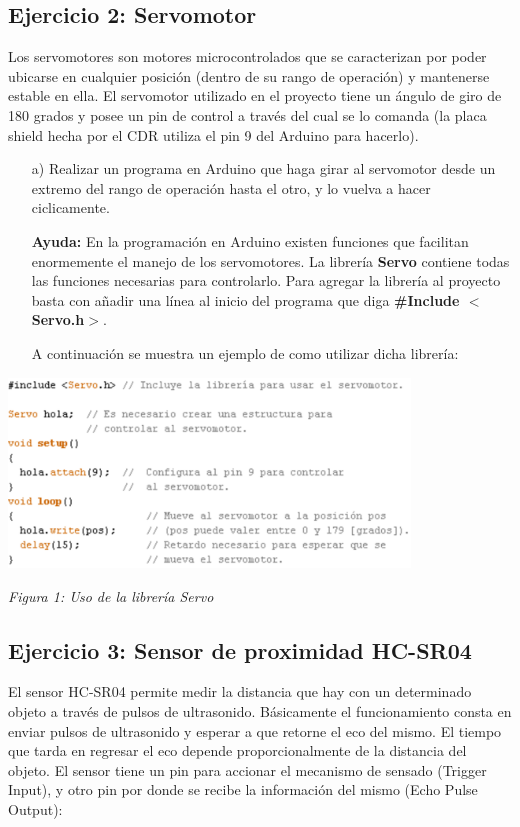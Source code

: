 \documentclass[a4paper,11pt]{article}
\begin{document}
\subsection*{Ejercicio 2: Servomotor}Los servomotores son motores microcontrolados que se caracterizan por poder ubicarse en cualquier posición (dentro de su rango de operación) y mantenerse estable en ella. El servomotor utilizado en el proyecto tiene un ángulo de giro de 180 grados y posee un pin de control a través del cual se lo comanda (la placa shield hecha por el CDR utiliza el pin 9 del Arduino para hacerlo).
\begin{itemize}
		\item[a) ] Realizar un programa en Arduino que haga girar al servomotor desde un extremo del rango de operación hasta el otro, y lo vuelva a hacer ciclicamente.
				
		\textbf{Ayuda:} En la programación en Arduino existen funciones que facilitan enormemente el manejo de los servomotores. La librería \textbf{Servo} contiene todas las funciones necesarias para controlarlo. Para agregar la librería al proyecto basta con añadir una línea al inicio del programa que diga \textbf{\#Include $<$Servo.h$>$}.
		
A continuación se muestra un ejemplo de como utilizar dicha librería:
			
\end{itemize}

	\begin{center}
		\includegraphics[width=0.8\textwidth]{fig/fig1.eps}
		\begin{center}	
			\textit{Figura 1: Uso de la librería Servo} 
		\end{center}	
	\end{center}



\subsection*{Ejercicio 3: Sensor de proximidad HC-SR04}
El sensor HC-SR04 permite medir la distancia que hay con un determinado objeto a través de pulsos de ultrasonido. Básicamente el funcionamiento consta en enviar pulsos de ultrasonido y esperar a que retorne el eco del mismo. El tiempo que tarda en regresar el eco depende proporcionalmente de la distancia del objeto. El sensor tiene un pin para accionar el mecanismo de sensado (Trigger Input), y otro pin por donde se recibe la información del mismo (Echo Pulse Output):
\end{document}
